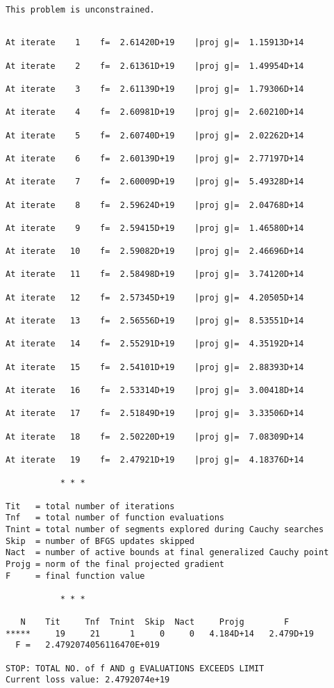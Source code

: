 \documentclass[11pt]{article}
\begin{document}
    \begin{Verbatim}[commandchars=\\\{\}]
 This problem is unconstrained.
    \end{Verbatim}

    \begin{Verbatim}[commandchars=\\\{\}]

At iterate    1    f=  2.61420D+19    |proj g|=  1.15913D+14

At iterate    2    f=  2.61361D+19    |proj g|=  1.49954D+14

At iterate    3    f=  2.61139D+19    |proj g|=  1.79306D+14

At iterate    4    f=  2.60981D+19    |proj g|=  2.60210D+14

At iterate    5    f=  2.60740D+19    |proj g|=  2.02262D+14

At iterate    6    f=  2.60139D+19    |proj g|=  2.77197D+14

At iterate    7    f=  2.60009D+19    |proj g|=  5.49328D+14

At iterate    8    f=  2.59624D+19    |proj g|=  2.04768D+14

At iterate    9    f=  2.59415D+19    |proj g|=  1.46580D+14

At iterate   10    f=  2.59082D+19    |proj g|=  2.46696D+14

At iterate   11    f=  2.58498D+19    |proj g|=  3.74120D+14

At iterate   12    f=  2.57345D+19    |proj g|=  4.20505D+14

At iterate   13    f=  2.56556D+19    |proj g|=  8.53551D+14

At iterate   14    f=  2.55291D+19    |proj g|=  4.35192D+14

At iterate   15    f=  2.54101D+19    |proj g|=  2.88393D+14

At iterate   16    f=  2.53314D+19    |proj g|=  3.00418D+14

At iterate   17    f=  2.51849D+19    |proj g|=  3.33506D+14

At iterate   18    f=  2.50220D+19    |proj g|=  7.08309D+14

At iterate   19    f=  2.47921D+19    |proj g|=  4.18376D+14

           * * *

Tit   = total number of iterations
Tnf   = total number of function evaluations
Tnint = total number of segments explored during Cauchy searches
Skip  = number of BFGS updates skipped
Nact  = number of active bounds at final generalized Cauchy point
Projg = norm of the final projected gradient
F     = final function value

           * * *

   N    Tit     Tnf  Tnint  Skip  Nact     Projg        F
*****     19     21      1     0     0   4.184D+14   2.479D+19
  F =   2.4792074056116470E+019

STOP: TOTAL NO. of f AND g EVALUATIONS EXCEEDS LIMIT
Current loss value: 2.4792074e+19
    \end{Verbatim}
\end{document}
